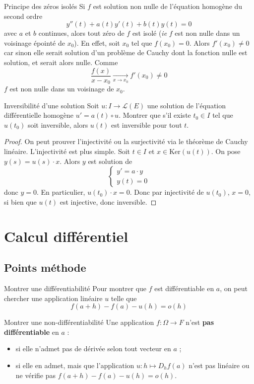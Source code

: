 \documentclass[french]{book}
\renewcommand{\ker}{\text{Ker}}
\theoremstyle{plain}
\theoremstyle{definition}
\theoremstyle{remark}
\begin{document}
\begin{AS}{Principe des zéros isolés} Si $f$ est solution non nulle de l’équation homogène du second ordre $$y''(t)+a(t)y'(t)+b(t)y(t)=0$$ avec $a$ et $b$ continues, alors tout zéro de $f$ est isolé (\textit{ie} $f$ est non nulle dans un voisinage épointé de $x_0$). En effet, soit $x_0$ tel que $f(x_0)=0$. Alors $f'(x_0)\ne0$ car sinon elle serait solution d'un problème de Cauchy dont la fonction nulle est solution, et serait alors nulle. Comme $$\frac{f(x)}{x-x_0}\xrightarrow[x\to x_0]{}f'(x_0)\ne 0$$ $f$ est non nulle dans un voisinage de $x_0$.
\end{AS}
\begin{AS}{Inversibilité d'une solution} Soit $u:I\to\mathcal{L}(E)$ une solution de l'équation différentielle homogène $u'=a(t)\circ u$. Montrer que s'il existe $t_0\in I$ tel que $u(t_0)$ soit inversible, alors $u(t)$ est inversible pour tout $t$.
\end{AS}
\begin{proof}
	On peut prouver l'injectivité ou la surjectivité via le théorème de Cauchy linéaire. L'injectivité est plus simple. Soit $t\in I$ et $x\in\ker(u(t))$. On pose $y(s)=u(s)\cdot x$. Alors $y$ est solution de $$\begin{cases}
		y'=a\cdot y\\
		y(t)=0
	\end{cases}$$ donc $y=0$. En particulier, $u(t_0)\cdot x=0$. Donc par injectivité de $u(t_0)$, $x=0$, si bien que $u(t)$ est injective, donc inversible.
\end{proof}


\chapter{Calcul différentiel}
\localtableofcontents
\section{Points méthode}

\begin{PM}{Montrer une différentiabilité}
	Pour montrer que $f$ est différentiable en $a$, on peut chercher une application linéaire $u$ telle que $$f(a+h)-f(a)-u(h)=o(h)$$
\end{PM}

\begin{PM}{Montrer une non-différentiabilité}
	Une application $f:\Omega\to F$ n'est \textbf{pas différentiable} en $a$ :
	\begin{itemize}
		\item si elle n'admet pas de dérivée selon tout vecteur en $a$ ;
		\item si elle en admet, mais que l'application $u:h\mapsto D_hf(a)$ n'est pas linéaire ou ne vérifie pas $f(a+h)-f(a)-u(h)=o(h)$.
	\end{itemize}
\end{PM}
\end{document}
